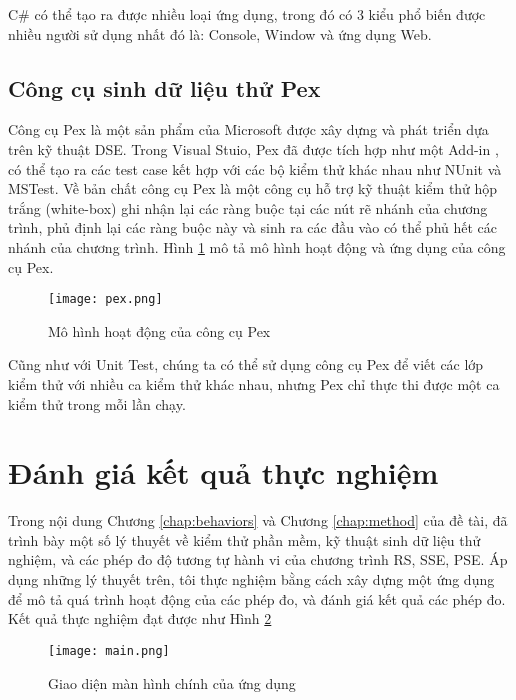 C\# có thể tạo ra được nhiều loại ứng dụng, trong đó có 3 kiểu phổ biến được 
nhiều người sử dụng nhất đó là: Console, Window và ứng dụng Web. 

\subsection{Công cụ sinh dữ liệu thử Pex}
Công cụ Pex là một sản phẩm của Microsoft được xây dựng và phát 
triển dựa trên kỹ thuật DSE. Trong Visual Stuio, Pex đã được tích hợp 
như một Add-in \cite{tillmann2014transferring}, có thể tạo ra các test case kết hợp với các bộ kiểm 
thử khác nhau như NUnit và MSTest. Về bản chất công cụ Pex là một công cụ hỗ trợ 
kỹ thuật kiểm thử hộp trắng (white-box) ghi nhận lại các ràng buộc tại các nút 
rẽ nhánh của chương trình, phủ định lại các ràng buộc này và sinh ra các đầu 
vào có thể phủ hết các nhánh của chương trình. Hình \ref{fig:ModelPex}\cite{tillmann2013teaching} mô tả 
mô hình hoạt động và ứng dụng của công cụ Pex.

\begin{figure}[H]	
	\begin{center}
		\texttt{[image: pex.png]}
	\end{center}
	\caption{Mô hình hoạt động của công cụ Pex}
	\label{fig:ModelPex}	
\end{figure}

Cũng như với Unit Test, chúng ta có thể sử dụng công cụ Pex để viết 
các lớp kiểm thử với nhiều ca kiểm thử khác nhau, nhưng Pex chỉ 
thực thi được một ca kiểm thử trong mỗi lần chạy.

\section{Đánh giá kết quả thực nghiệm}

Trong nội dung Chương \ref{chap:behaviors} và Chương \ref{chap:method} của đề tài, 
đã trình bày một số lý thuyết về kiểm thử phần mềm, kỹ thuật sinh dữ liệu thử nghiệm, 
và các phép đo độ tương tự hành vi của chương trình RS, SSE, PSE. Áp dụng những
lý thuyết trên, tôi thực nghiệm bằng cách xây dựng một ứng dụng để mô tả
quá trình hoạt động của các phép đo, và đánh giá kết quả các phép đo. 
Kết quả thực nghiệm đạt được như Hình \ref{fig:frmMain}

\begin{figure}[H]	
	\begin{center}
	 \texttt{[image: main.png]}
	\end{center}
	\caption{Giao diện màn hình chính của ứng dụng}
	\label{fig:frmMain}
\end{figure}

